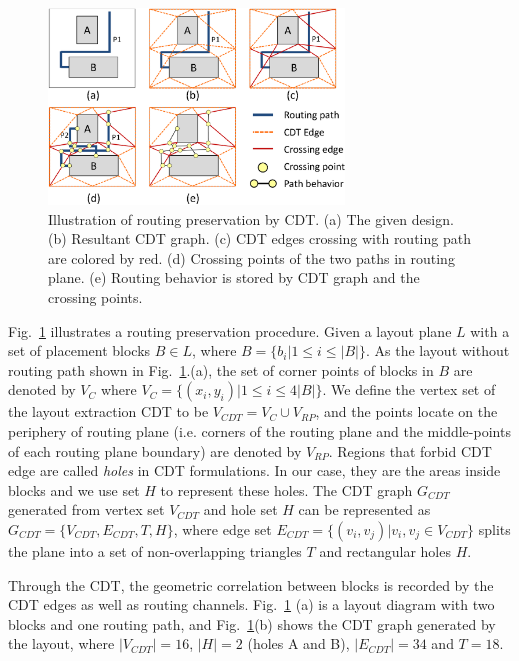       \begin{figure}[t]
        \begin{center}
        \includegraphics[width=0.7\textwidth]{Fig/Chapter4/CDT.eps}
        \caption{Illustration of routing preservation by CDT. 
          (a) The given design.
          (b) Resultant CDT graph.
          (c) CDT edges crossing with routing path are colored by red.
          (d) Crossing points of the two paths in routing plane.
          (e) Routing behavior is stored by CDT graph and the crossing points.}
        \label{fig:CGC}
        \end{center}
      \end{figure}

      Fig.~\ref{fig:CGC} illustrates a routing preservation procedure. Given a layout plane $L$ with a set of placement blocks $B \in L$, where $B = \{b_i|1 \leq i \leq |B|\}$. As the layout without routing path shown in Fig.~\ref{fig:CGC}.(a), the set of corner points of blocks in $B$ are denoted by $V_C$ where $V_C = \{(x_i,y_i)|1 \leq i \leq 4|B|\}$. We define the vertex set of the layout extraction CDT to be $V_{CDT} = V_C \cup V_{RP}$, and the points locate on the periphery of routing plane (i.e. corners of the routing plane and the middle-points of each routing plane boundary) are denoted by $V_{RP}$. Regions that forbid CDT edge are called {\it holes} in CDT formulations. In our case, they are the areas inside blocks and we use set $H$ to represent these holes. The CDT graph $G_{CDT}$ generated from vertex set $V_{CDT}$ and hole set $H$ can be represented as $G_{CDT} = \{V_{CDT},E_{CDT},T,H\}$, where edge set $E_{CDT} = \{(v_i,v_j)|v_i,v_j\in V_{CDT}\}$ splits the plane into a set of non-overlapping triangles $T$ and rectangular holes $H$.

      Through the CDT, the geometric correlation between blocks is recorded by the CDT edges as well as routing channels. Fig.~\ref{fig:CGC} (a) is a layout diagram with two blocks and one routing path, and Fig.~\ref{fig:CGC}(b) shows the CDT graph generated by the layout, where $|V_{CDT}|=16$, $|H|=2$ (holes A and B), $|E_{CDT}|=34$ and $T=18$. 

